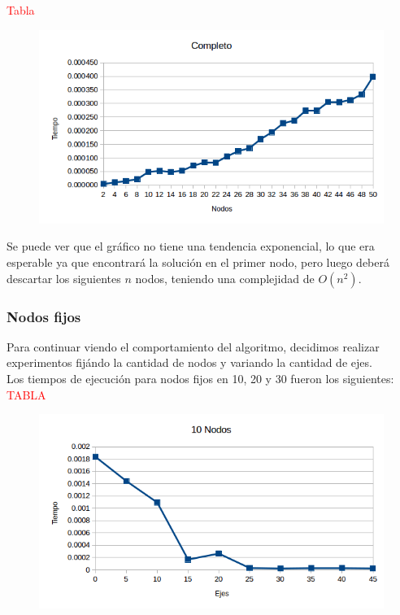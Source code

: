 \textcolor{red}{Tabla}

  \begin{figure}[h!]
   \begin{center}
 	\includegraphics[scale=0.7]{imagenes/exacto/Completos.png}
	\label{GrafoCompleto}
   \end{center}
 \end{figure}

Se puede ver que el gr\'afico no tiene una tendencia exponencial, lo que era esperable ya que encontrar\'a la soluci\'on en el primer nodo, pero luego deber\'a descartar los siguientes $n$ nodos,
teniendo una complejidad de $O(n^2)$.\\

\newpage

\subsubsection{Nodos fijos}
Para continuar viendo el comportamiento del algoritmo, decidimos realizar experimentos fij\'ando la cantidad de nodos y variando la cantidad de ejes.\\
Los tiempos de ejecuci\'on para nodos fijos en 10, 20 y 30 fueron los siguientes:\\
\textcolor{red}{TABLA}

  \begin{figure}[h!]
   \begin{center}
 	\includegraphics[scale=0.7]{imagenes/exacto/10Nodos.png}
	\label{10Nodos}
   \end{center}
 \end{figure}

